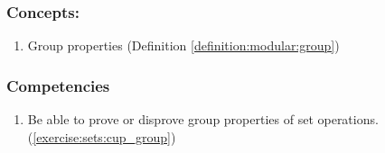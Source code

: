 \subsubsection*{Concepts:}
\begin{enumerate}
\item 
Group properties   (Definition \ref{definition:modular:group})
\end{enumerate}

\subsubsection*{Competencies}
\begin{enumerate}
\item
Be able to prove or disprove group properties of set operations. (\ref{exercise:sets:cup_group}) 
\end{enumerate}
